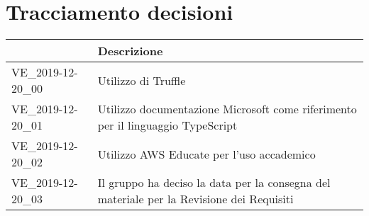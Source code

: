 \section{Tracciamento decisioni}
\renewcommand{\arraystretch}{1.8}

  \begin{longtable}{|p{5cm}|p{9cm}|}
    \hline

    \rowcolor{header}
    \centering{\textbf{Codice}} &  \textbf{Descrizione}\\

    \hline

    VE\_2019-12-20\_00 & Utilizzo di Truffle  \\
    VE\_2019-12-20\_01 & Utilizzo documentazione Microsoft come riferimento per il linguaggio TypeScript\\
    VE\_2019-12-20\_02 & Utilizzo AWS Educate per l'uso accademico\\
    VE\_2019-12-20\_03 & Il gruppo ha deciso la data per la consegna del materiale per la Revisione dei Requisiti\\
    \hline
  \end{longtable}
